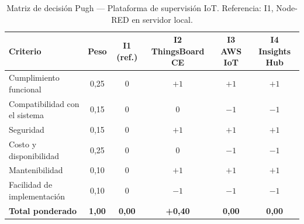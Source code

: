 \begin{table}[H]
\centering
\caption{Matriz de decisión Pugh --- Plataforma de supervisión IoT. Referencia: I1, Node-RED en servidor local.}
\label{tab:pugh-iot}
\begin{tabularx}{\textwidth}{Xccccc}
\toprule
\textbf{Criterio} & \textbf{Peso} & \textbf{I1 (ref.)} & \textbf{I2 ThingsBoard CE} & \textbf{I3 AWS IoT} & \textbf{I4 Insights Hub} \\
\midrule
Cumplimiento funcional        & 0,25 & 0 & $+1$ & $+1$ & $+1$ \\
Compatibilidad con el sistema & 0,15 & 0 & 0    & $-1$ & $-1$ \\
Seguridad                     & 0,15 & 0 & $+1$ & $+1$ & $+1$ \\
Costo y disponibilidad        & 0,25 & 0 & 0    & $-1$ & $-1$ \\
Mantenibilidad                & 0,10 & 0 & $+1$ & $+1$ & $+1$ \\
Facilidad de implementación   & 0,10 & 0 & $-1$ & $-1$ & $-1$ \\
\midrule
\textbf{Total ponderado}      & \textbf{1,00} & \textbf{0,00} & \textbf{+0,40} & \textbf{0,00} & \textbf{0,00} \\
\bottomrule
\end{tabularx}
\end{table}
